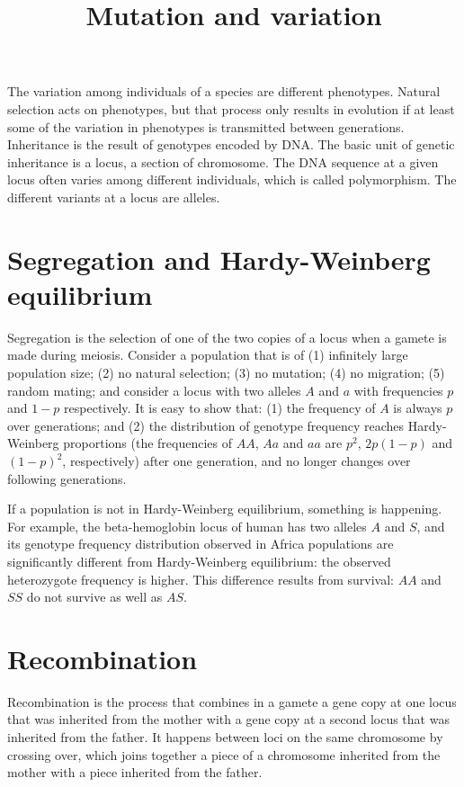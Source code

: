 \documentclass[11pt]{article}
\title{Mutation and variation}
\author{}
\date{}
\begin{document}
\begin{sloppypar}
  \maketitle

  \linenumbers
The variation among individuals of a species are different phenotypes. 
Natural selection acts on phenotypes, but that process only results in evolution if at least some of the variation in phenotypes is transmitted between generations. 
Inheritance is the result of genotypes encoded by DNA. 
The basic unit of genetic inheritance is a locus, a section of chromosome. 
The DNA sequence at a given locus often varies among different individuals, which is called polymorphism. 
The different variants at a locus are alleles. 

\section{Segregation and Hardy-Weinberg equilibrium}
Segregation is the selection of one of the two copies of a locus when a gamete is made during meiosis. 
Consider a population that is of 
(1) infinitely large population size; 
(2) no natural selection; 
(3) no mutation; 
(4) no migration; 
(5) random mating; 
and consider a locus with two alleles $A$ and $a$ with frequencies $p$ and $1-p$ respectively. 
It is easy to show that: 
(1) the frequency of $A$ is always $p$ over generations; and 
(2) the distribution of genotype frequency reaches Hardy-Weinberg proportions (the frequencies of $AA$, $Aa$ and $aa$ are $p^2$, $2p(1-p)$ and $(1-p)^2$, respectively) after one generation, and no longer changes over following generations. 

\par

If a population is not in Hardy-Weinberg equilibrium, something is happening. 
For example, the beta-hemoglobin locus of human has two alleles $A$ and $S$, and its genotype frequency distribution observed in Africa populations are significantly different from Hardy-Weinberg equilibrium: the observed heterozygote frequency is higher. 
This difference results from survival: $AA$ and $SS$ do not survive as well as $AS$. 

\section{Recombination}
Recombination is the process that combines in a gamete a gene copy at one locus that was inherited from the mother with a gene copy at a second locus that was inherited from the father. 
It happens between loci on the same chromosome by crossing over, which joins together a piece of a chromosome inherited from the mother with a piece inherited from the father. 


\end{sloppypar}
\end{document}
